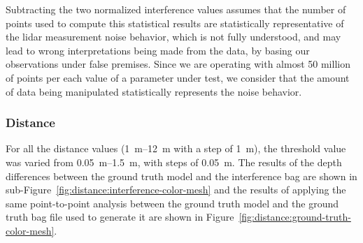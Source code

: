Subtracting the two normalized interference values assumes that the number of points used to compute this statistical results are statistically representative of the \ac{lidar} measurement noise behavior, which is not fully understood, and may lead to wrong interpretations being made from the data, by basing our observations under false premises. Since we are operating with almost 50 million of points per each value of a parameter under test, we consider that the amount of data being manipulated statistically represents the noise behavior.

\subsubsection{Distance}
For all the distance values (\SIrange{1}{12}{\meter} with a step of \SI{1}{\meter}), the threshold value was varied from \SIrange{0.05}{1.5}{\meter}, with steps of \SI{0.05}{\meter}. The results of the depth differences between the ground truth model and the interference bag are shown in sub-Figure~\ref{fig:distance:interference-color-mesh} and the results of applying the same point-to-point analysis between the ground truth model and the ground truth bag file used to generate it are shown in Figure~\ref{fig:distance:ground-truth-color-mesh}.

